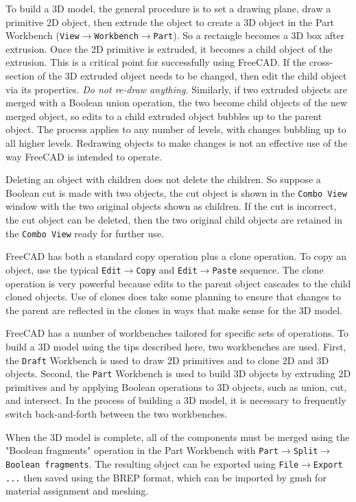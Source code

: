 \documentclass[titlepage]{article}
\renewcommand\_{\textunderscore\linebreak[1]}
\begin{document}
To build a 3D model, the general procedure is to set a drawing plane, draw a primitive 2D object, then extrude the object to create a 3D object in the Part Workbench (\texttt{View}$\rightarrow$\texttt{Workbench}$\rightarrow$\texttt{Part}).  So a rectangle becomes a 3D box after extrusion.  Once the 2D primitive is extruded, it becomes a child object of the extrusion.  This is a critical point for successfully using FreeCAD.  If the cross-section of the 3D extruded object needs to be changed, then edit the child object via its properties.  \textit{Do not re-draw anything.}  Similarly, if two extruded objects are merged with a Boolean union operation, the two become child objects of the new merged object, so edits to a child extruded object bubbles up to the parent object.  The process applies to any number of levels, with changes bubbling up to all higher levels.  Redrawing objects to make changes is not an effective use of the way FreeCAD is intended to operate.

Deleting an object with children does not delete the children.  So suppose a Boolean cut is made with two objects, the cut object is shown in the \texttt{Combo View} window with the two original objects shown as children.  If the cut is incorrect, the cut object can be deleted, then the two original child objects are retained in the \texttt{Combo View} ready for further use.

FreeCAD has both a standard copy operation plus a clone operation.  To copy an object, use the typical \texttt{Edit}$\rightarrow$\texttt{Copy} and \texttt{Edit}$\rightarrow$\texttt{Paste} sequence.  The clone operation is very powerful because edits to the parent object cascades to the child cloned objects.  Use of clones does take some planning to ensure that changes to the parent are reflected in the clones in ways that make sense for the 3D model.

FreeCAD has a number of workbenches tailored for specific sets of operations.  To build a 3D model using the tips described here, two workbenches are used.  First, the \texttt{Draft} Workbench is used to draw 2D primitives and to clone 2D and 3D objects.  Second, the \texttt{Part} Workbench is used to build 3D objects by extruding 2D primitives and by applying Boolean operations to 3D objects, such as union, cut, and intersect.  In the process of building a 3D model, it is necessary to frequently switch back-and-forth between the two workbenches.

When the 3D model is complete, all of the components must be merged using the "Boolean fragments" operation in the Part Workbench with \texttt{Part}$\rightarrow$\texttt{Split}$\rightarrow$\texttt{Boolean fragments}.  The resulting object can be exported using \texttt{File}$\rightarrow$\texttt{Export ...} then saved using the BREP format, which can be imported by gmsh for material assignment and meshing. 
\end{document}
